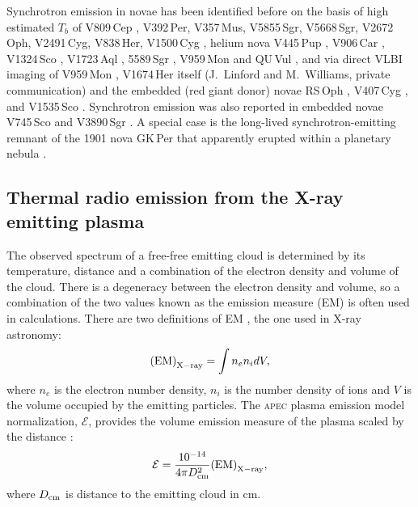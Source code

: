 \documentclass[a4paper,fleqn,usenatbib]{mnras}
\newcommand{\nova}{V1674\,Her}
\begin{document}
Synchrotron emission in novae has been identified before on the basis of 
high estimated $T_b$ of  
%
V809\,Cep \citep{2022MNRAS.515.3028B}, 
V392\,Per, V357\,Mus, V5855\,Sgr, V5668\,Sgr, V2672\,Oph, V2491\,Cyg,
V838\,Her, V1500\,Cyg \citep{2021ApJS..257...49C},
helium nova V445\,Pup \citep{2021MNRAS.501.1394N}, 
V906\,Car \citep{2020NatAs...4..776A}, V1324\,Sco \citep{2018ApJ...852..108F},
V1723\,Aql \citep{2016MNRAS.457..887W}, 5589\,Sgr \citep{2016MNRAS.460.2687W},
V959\,Mon \citep{2014Natur.514..339C} and QU\,Vul \citep{1987A&A...183...38T}, 
%
and 
via direct VLBI imaging of V959\,Mon \citep{2014evn..confE..53Y}, \nova{} 
itself (J.~Linford and M.~Williams, private communication) 
and the embedded (red giant donor) novae 
RS\,Oph \citep{1989MNRAS.237...81T,2006Natur.442..279O,2008ApJ...688..559R,2008ApJ...685L.137S,2009MNRAS.395.1533E,2022A&A...666L...6M,2023arXiv230110552D},
V407\,Cyg \citep{2020A&A...638A.130G}, and V1535\,Sco \citep{2017ApJ...842...73L}.
%
Synchrotron emission was also reported in embedded novae
V745\,Sco \citep{2016MNRAS.456L..49K}
and 
V3890\,Sgr \citep{2023arXiv230109116N}.
%
A special case is the long-lived synchrotron-emitting remnant of 
the 1901 nova GK\,Per that apparently erupted within a planetary nebula
\citep{1989ApJ...344..805S,2016A&A...595A..64H}.


\subsection{Thermal radio emission from the X-ray emitting plasma}
\label{sec:thermalradiofromxrayplasma}

The observed spectrum of a free-free emitting cloud is determined by its
temperature, distance and a combination of the electron density and volume
of the cloud. There is a degeneracy between the electron density and volume,
so a combination of the two values known as the emission measure (EM) is
often used in calculations. There are two definitions of EM \citep[e.g.][]{2016MNRAS.457..887W}, 
the one used in X-ray astronomy:
\begin{equation}
{\rm (EM)}_{\rm X-ray} = \int n_e n_i dV,
\label{eq:emxray}
\end{equation}
where $n_e$ is the electron number density, $n_i$ is the number density of
ions and $V$ is the volume occupied by the emitting particles. The
\textsc{apec} plasma emission model normalization, $\mathcal{E}$, provides the volume emission measure of the
plasma scaled by the distance \citep{2011hxra.book.....A}:
\begin{equation}
\mathcal{E} = \frac{10^{-14}}{4 \pi D_{\rm cm}^2} {\rm (EM)}_{\rm X-ray},
\label{eq:emnorm}
\end{equation}
where $D_{\rm cm}$ is distance to the emitting cloud in cm.
\end{document}

